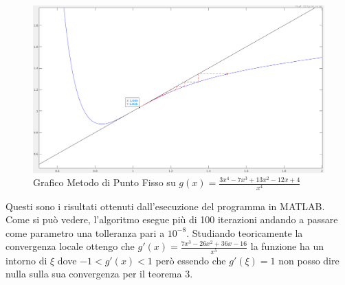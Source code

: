 \documentclass[12pt, letterpaper]{article}
\begin{document}
\begin{figure}[ht!]
    \includegraphics[scale=0.38]{MultiRadixPuntoFisso.png}
    \caption{Grafico Metodo di Punto Fisso su $g(x)=\frac{3x^4-7x^3+13x^2-12x+4}{x^4}$}
\end{figure}

\newpage

Questi sono i risultati ottenuti dall'esecuzione del programma in MATLAB.\\ Come si può vedere, l'algoritmo esegue più di 100 iterazioni andando a passare come parametro una tolleranza pari a $10^{-8}$.
Studiando teoricamente la convergenza locale ottengo che $g'(x)=\frac{7x^3-26x^2+36x-16}{x^5}$ la funzione ha un intorno di $\xi$ dove $-1<g'(x)<1$ però essendo che $g'(\xi)=1$ non posso dire nulla sulla sua convergenza per il teorema 3.
\end{document}

